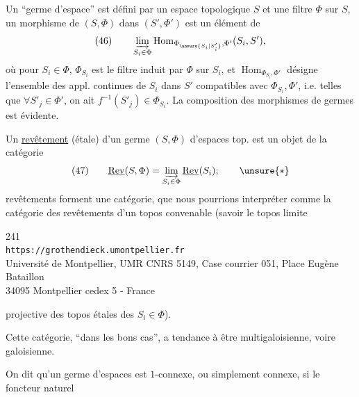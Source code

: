 
Un ``germe d'espace'' est défini par un espace topologique $S$ et une  filtre $\Phi$ sur $S$, un morphisme de $(S,\Phi)$ dans $(S',\Phi')$ est un élément de
\[
\text{(46)}\qquad
\varinjlim_{S_i\in\Phi}\operatorname{Hom}_{\Phi_{\unsure{S_i|S'_i}},\Phi'}(S_i,S'),
\]
où  pour $S_i\in\Phi$, $\Phi_{S_i}$ est le filtre induit par $\Phi$ sur $S_i$, et $\operatorname{Hom}_{\Phi_{S_i},\Phi'}$ désigne l'ensemble des appl. continues  de $S_i$ dans $S'$ compatibles avec $\Phi_{S_i},\Phi'$, i.e. telles que $\forall S'_j\in\Phi'$,  on ait $f^{-1}(S'_j)\in\Phi_{S_i}$. La composition des morphismes de germes est évidente.

Un \uline{revêtement} (étale) d'un germe $(S,\Phi)$ d'espaces top. est un objet de la catégorie
\[
\text{(47)}\qquad
\underline{\mathrm{Rev}}(S,\Phi)=\varinjlim_{S_i\in\Phi}\underline{\mathrm{Rev}}(S_i);\qquad\unsure{*}
\]
 revêtements forment une catégorie, que nous pourrions  interpréter  comme la catégorie des revêtements d'un topos convenable (savoir le topos limite

\begin{center}
241\\
\texttt{https://grothendieck.umontpellier.fr}\\
Université de Montpellier, UMR CNRS 5149, Case courrier 051, Place Eugène Bataillon\\
34095 Montpellier cedex 5 - France
\end{center}


projective des  topos étales des $S_i\in\Phi$).

Cette catégorie, ``dans les bons cas'', a tendance à être multigaloisienne, voire galoisienne.

On dit qu'un germe  d'espaces est $1$-connexe, ou simplement connexe, si le foncteur naturel


